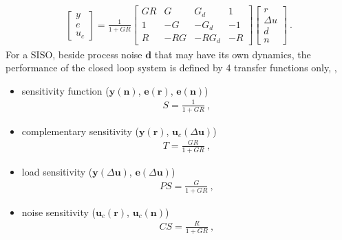 \documentclass[letterpaper,10pt,english]{jupyterBook}
\begin{document}
\begin{equation*}
\begin{split}
\begin{bmatrix} y \\ e \\ u_c \end{bmatrix} =
\frac{1}{1+GR} \begin{bmatrix}
 G R & G & G_d & 1 \\
 1 & -   G & -   G_d & - 1 \\
 R & - R G & - R G_d & - R 
\end{bmatrix}
\begin{bmatrix} r \\ \Delta u \\ d \\ n \end{bmatrix} \ .
\end{split}
\end{equation*}
\sphinxAtStartPar
For a SISO, beside process noise \(\mathbf{d}\) that may have its own dynamics, the performance of the closed loop system is defined by 4 transfer functions only, ,
\begin{itemize}
\item {} 
\sphinxAtStartPar
sensitivity function (\(\mathbf{y}(\mathbf{n})\), \(\mathbf{e}(\mathbf{r})\), \(\mathbf{e}(\mathbf{n})\))
\begin{equation*}
\begin{split}S = \frac{1}{1 + GR} \ ,\end{split}
\end{equation*}
\item {} 
\sphinxAtStartPar
complementary sensitivity (\(\mathbf{y}(\mathbf{r})\), \(\mathbf{u}_c(\Delta \mathbf{u})\))
\begin{equation*}
\begin{split}T = \frac{GR}{1 + GR} \ ,\end{split}
\end{equation*}
\item {} 
\sphinxAtStartPar
load sensitivity (\(\mathbf{y}(\Delta \mathbf{u})\), \(\mathbf{e}(\Delta \mathbf{u})\))
\begin{equation*}
\begin{split}PS = \frac{G}{1 + GR} \ ,\end{split}
\end{equation*}
\item {} 
\sphinxAtStartPar
noise sensitivity (\(\mathbf{u}_c(\mathbf{r})\), \(\mathbf{u}_c(\mathbf{n})\))
\begin{equation*}
\begin{split}CS = \frac{R}{1 + GR} \ ,\end{split}
\end{equation*}
\end{itemize}
\end{document}
